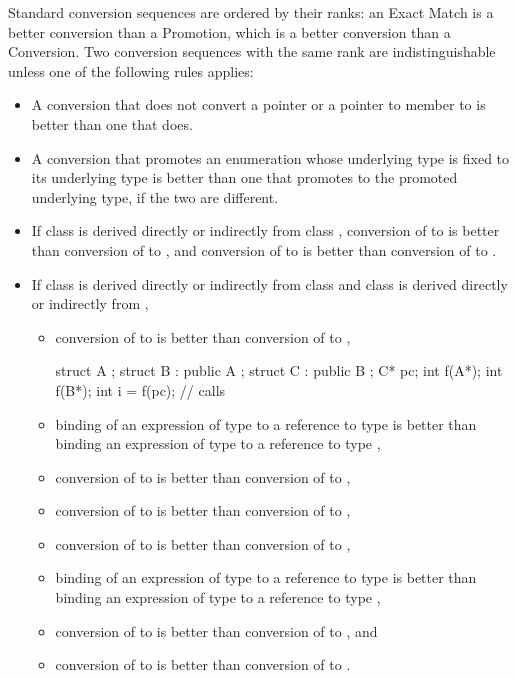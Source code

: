 \pnum
Standard conversion sequences are ordered by their ranks: an Exact Match is a
better conversion than a Promotion, which is a better conversion than
a Conversion.
Two conversion sequences with the same rank are indistinguishable unless
one of the following rules applies:
\begin{itemize}
\item
A conversion that does not convert a pointer or a pointer to member
to
is better than one that does.

\item
A conversion that promotes an enumeration whose underlying type is fixed to its underlying
type is better than one that promotes to the promoted underlying type, if the two are
different.

\item
If class
is derived directly or indirectly from class
,
conversion of
to
is better than conversion of
to
,
and conversion of
to
is better than conversion
of
to
.
\item
If class
is derived directly or indirectly from class
and class
is derived directly or indirectly from
,
\begin{itemize}
\item
conversion of
to
is better than conversion of
to
,
\begin{example}
\begin{codeblock}
struct A {};
struct B : public A {};
struct C : public B {};
C* pc;
int f(A*);
int f(B*);
int i = f(pc);                  // calls 
\end{codeblock}
\end{example}

\item
binding of an expression of type
to a reference to type
is better than binding an expression of type
to a reference to type
,
\item
conversion of
to
is better than conversion of
to
,
\item
conversion of
to
is better than conversion of
to
,
\item
conversion of
to
is better than conversion of
to
,
\item
binding of an expression of type
to a reference to type
is better than binding an expression of type
to a
reference to type
,
\item
conversion of
to
is better than conversion
of
to
,
and
\item
conversion of
to
is better than conversion of
to
.
\end{itemize}


\end{itemize}
